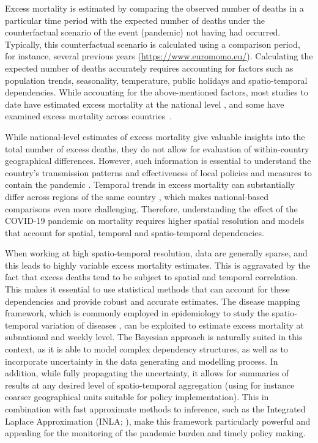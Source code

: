 Excess mortality is estimated by comparing the observed number of deaths in a particular time period with the expected number of deaths under the counterfactual scenario of the event (pandemic) not having had occurred. Typically, this counterfactual scenario is calculated using a comparison period, for instance, several previous years (\url{https://www.euromomo.eu/}). Calculating the expected number of deaths accurately requires accounting for factors such as population trends, seasonality, temperature, public holidays and spatio-temporal dependencies. While accounting for the above-mentioned factors, most studies to date have estimated excess mortality at the national level \citep[see][]{rossen2020excess, weinberger2020estimation}, and some have examined excess mortality across countries~\citep{islam2021excess, kontis2020magnitude, kontis2021lessons}. 

While national-level estimates of excess mortality give valuable insights into the total number of excess deaths, they do not allow for evaluation of within-country geographical differences. However, such information is essential to understand the country's transmission patterns and effectiveness of local policies and measures to contain the pandemic \citep{kontopantelis2021excess}. Temporal trends in excess mortality can substantially differ across regions of the same country \citep{Blangiardo2020}, which makes national-based comparisons even more challenging. Therefore, understanding the effect of the COVID-19 pandemic on mortality requires higher spatial resolution and models that account for spatial, temporal and spatio-temporal dependencies. 

When working at high spatio-temporal resolution, data are generally sparse, and this leads to highly variable excess mortality estimates. This is aggravated by the fact that excess deaths tend to be subject to spatial and temporal correlation. This makes it essential to use statistical methods that can account for these dependencies and provide robust and accurate estimates. The disease mapping framework, which is commonly employed in epidemiology to study the spatio-temporal variation of diseases \citep{waller1997hierarchical, moragarjournal}, can be exploited to estimate excess mortality at subnational and weekly level. The Bayesian approach is naturally suited in this context, as it is able to model complex dependency structures, as well as to incorporate uncertainty in the data generating and modelling process. In addition, while fully propagating the uncertainty, it allows for summaries of results at any desired level of spatio-temporal aggregation (using for instance coarser geographical units suitable for policy implementation). This in combination with fast approximate methods to inference, such as the Integrated Laplace Approximation (INLA; \citealp{rue2009approximate}), make this framework particularly powerful and appealing for the monitoring of the pandemic burden and timely policy making.

